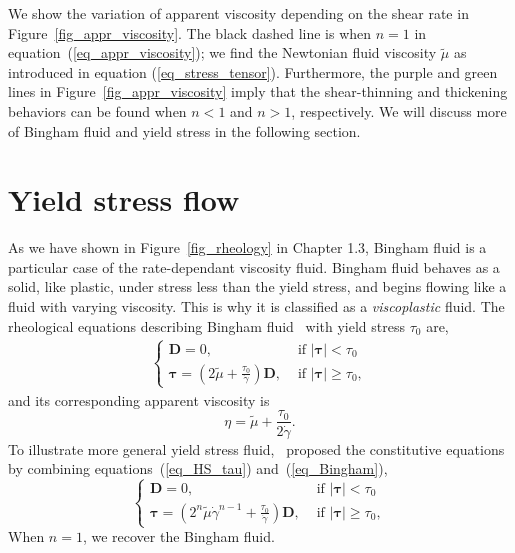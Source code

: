 We show the variation of apparent viscosity depending on the shear rate in Figure~\ref{fig_appr_viscosity}.
The black dashed line is when $n = 1$ in equation~(\ref{eq_appr_viscosity}); we find the Newtonian fluid viscosity $\tilde{\mu}$ as introduced in equation (\ref{eq_stress_tensor}). 
Furthermore, the purple and green lines in Figure~\ref{fig_appr_viscosity} imply that the shear-thinning and thickening behaviors can be found when $n < 1$ and $n>1$, respectively. 
We will discuss more of Bingham fluid and yield stress in the following section. 

\section{Yield stress flow}
As we have shown in Figure~\ref{fig_rheology} in Chapter 1.3, Bingham fluid is a particular case of the rate-dependant viscosity fluid. 
Bingham fluid behaves as a solid, like plastic, under stress less than the yield stress, and begins flowing like a fluid with varying viscosity. 
This is why it is classified as a \textit{viscoplastic} fluid.
The rheological equations describing Bingham fluid~\cite{bingham_investigation_1917} with yield stress $\tau_0$ are,
\begin{align}
  \left\{\begin{matrix}
 {\bm D} =0, & \text { if } |{\bm \tau} | <\tau_0 \\
  {\bm \tau}  = 
\left(2 \tilde{\mu} + \frac{\tau_0}{ \dot{\gamma}}\right) {\bm D} , & \text { if } |{\bm \tau}|\geq \tau_0,
\end{matrix}\right.
\label{eq_Bingham}
  \end{align}
and its corresponding apparent viscosity is
\begin{equation}
  \eta=\tilde{\mu} +\frac{\tau_0}{2 \dot{\gamma}}.
  \end{equation}
  To illustrate more general yield stress fluid,~\cite{sverdrup_highly_2018} proposed the constitutive equations by combining equations~(\ref{eq_HS_tau}) and~(\ref{eq_Bingham}),
  \begin{equation}
    \left\{\begin{matrix}
  {\bm D }=0, 
    & \text { if } |{\bm \tau}| < \tau_0 
    \\
    {\bm \tau}  =
    \left(2^n \tilde{\mu} \dot{\gamma}^{n-1} + \frac{\tau_0}{ \dot{\gamma}}\right) {\bm D}, 
    & \text { if } |{\bm \tau}|  \geq \tau_0,
  \end{matrix}\right. 
  \label{eq_HS_B}
   \end{equation}
When $n = 1$, we recover the Bingham fluid.
